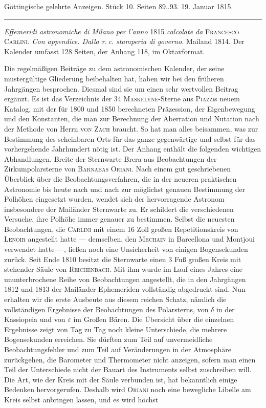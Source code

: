 \clearpage
{}
\hypertarget{native-579-lower}{}
\begin{center}\small Göttingische gelehrte Anzeigen. Stück 10. Seiten 89..93. 19. Januar 1815.\\[3pt]\rule{.72\linewidth}{.3pt}\end{center}

{\setlength{\rightskip}{0pt plus 3em}\emph{Effemeridi astronomiche di Milano per l'anno} 1815 \emph{calcolate da} \textsc{Francesco Carlini}.
\emph{Con appendice. Dalla r.\,c. stamperia di governo.} Mailand 1814. Der Kalender umfasst 128 Seiten, der Anhang 118, im Oktavformat.\par}

Die regelmäßigen Beiträge zu dem astronomischen Kalender, der seine mustergültige Gliederung beibehalten hat, haben wir bei den früheren Jahrgängen besprochen. Diesmal sind sie um einen sehr wertvollen Beitrag ergänzt. Es ist das Verzeichnis der 34 \textsc{Maskelyne}-Sterne aus \textsc{Piazzi}s neuem Katalog, mit der für 1800 und 1850 berechneten Präzession, der Eigenbewegung und den Konstanten, die man zur Berechnung der Aberration und Nutation nach der Methode von Herrn \textsc{von Zach} braucht. So hat man alles beisammen, was zur Bestimmung des scheinbaren Orts für das ganze gegenwärtige und selbst für das vorhergehende Jahrhundert nötig ist. Der Anhang enthält die folgenden wichtigen Abhandlungen. Breite der Sternwarte Brera aus Beobachtungen der Zirkumpolarsterne von \textsc{Barnabas Oriani}. Nach einem gut geschriebenen Überblick über die Beobachtungsverfahren, die in der neueren praktischen Astronomie bis heute nach und nach zur möglichst genauen Bestimmung der Polhöhen eingesetzt wurden, wendet sich der hervorragende Astronom insbesondere der Mailänder Sternwarte zu. Er schildert die verschiedenen Versuche, ihre Polhöhe immer genauer zu bestimmen. Selbst die neuesten Beobachtungen, die \textsc{Carlini} mit einem 16 Zoll großen Repetitionskreis von \textsc{Lenoir} angestellt hatte — demselben, den \textsc{Mechain} in Barcellona und Montjoui verwendet hatte —, ließen noch eine Unsicherheit von einigen Bogensekunden zurück. Seit Ende 1810 besitzt die Sternwarte einen 3 Fuß großen Kreis mit stehender Säule von \textsc{Reichenbach}. Mit ihm wurde im Lauf eines Jahres eine ununterbrochene Reihe von Beobachtungen angestellt, die in den Jahrgängen 1812 und 1813 der Mailänder Ephemeriden vollständig abgedruckt sind. Nun erhalten wir die erste Ausbeute aus diesem reichen Schatz, nämlich die vollständigen Ergebnisse der Beobachtungen des Polarsterns, von $\delta$ in der Kassiopeia und von $\varepsilon$ im Großen Bären. Die Übersicht über die einzelnen Ergebnisse zeigt von Tag zu Tag noch kleine Unterschiede, die mehrere Bogensekunden erreichen. Sie dürften zum Teil auf unvermeidliche Beobachtungsfehler und zum Teil auf Veränderungen in der Atmosphäre zurückgehen, die Barometer und Thermometer nicht anzeigen, sofern man einen Teil der Unterschiede nicht der Bauart des Instruments selbst zuschreiben will. Die Art, wie der Kreis mit der Säule verbunden ist, hat bekanntlich einige Bedenken hervorgerufen. Deshalb wird \textsc{Oriani} noch eine bewegliche Libelle am Kreis selbst anbringen lassen, und es wird höchst 